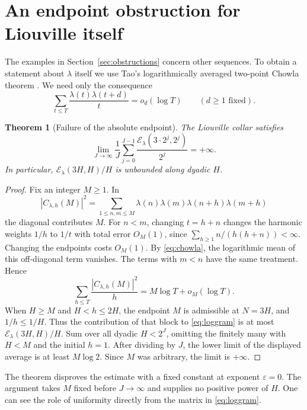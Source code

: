 \documentclass[11pt]{amsart}
\newtheorem{theorem}{Theorem}[section]
\theoremstyle{definition}
\theoremstyle{remark}
\newcommand{\E}{\mathcal E}
\numberwithin{equation}{section}
\begin{document}
\section{An endpoint obstruction for Liouville itself}\label{sec:tao}

The examples in Section~\ref{sec:obstructions} concern other sequences. To obtain a statement about \(\lambda\) itself we use Tao's logarithmically averaged two-point Chowla theorem \cite{tao}. We need only the consequence
\begin{equation}\label{eq:chowla}
 \sum_{t\le T}\frac{\lambda(t)\lambda(t+d)}{t}=o_d(\log T)
 \qquad(d\ge1\text{ fixed}).
\end{equation}

\begin{theorem}[Failure of the absolute endpoint]\label{thm:endpoint}
The Liouville collar satisfies
\[
 \lim_{J\to\infty}\frac1J
 \sum_{j=0}^{J-1}\frac{\E_\lambda(3\cdot 2^j,2^j)}{2^j}=+\infty.
\]
In particular, \(\E_\lambda(3H,H)/H\) is unbounded along dyadic \(H\).
\end{theorem}
\begin{proof}
Fix an integer \(M\ge1\). In
\[
 |C_{\lambda,h}(M)|^2=
 \sum_{1\le n,m\le M}\lambda(n)\lambda(m)\lambda(n+h)\lambda(m+h)
\]
the diagonal contributes \(M\). For \(n<m\), changing \(t=h+n\) changes the harmonic weights \(1/h\) to \(1/t\) with total error \(O_M(1)\), since \(\sum_{h\ge1}n/(h(h+n))<\infty\). Changing the endpoints costs \(O_M(1)\). By \eqref{eq:chowla}, the logarithmic mean of this off-diagonal term vanishes. The terms with \(m<n\) have the same treatment. Hence
\begin{equation}\label{eq:loggram}
 \sum_{h\le T}\frac{|C_{\lambda,h}(M)|^2}{h}
 =M\log T+o_M(\log T).
\end{equation}
When \(H\ge M\) and \(H<h\le2H\), the endpoint \(M\) is admissible at \(N=3H\), and \(1/h\le1/H\). Thus the contribution of that block to \eqref{eq:loggram} is at most \(\E_\lambda(3H,H)/H\). Sum over all dyadic \(H<2^J\), omitting the finitely many with \(H<M\) and the initial \(h=1\). After dividing by \(J\), the lower limit of the displayed average is at least \(M\log 2\). Since \(M\) was arbitrary, the limit is \(+\infty\).
\end{proof}

The theorem disproves the estimate with a fixed constant at exponent \(\varepsilon=0\). The argument takes \(M\) fixed before \(J\to\infty\) and supplies no positive power of \(H\). One can see the role of uniformity directly from the matrix in \eqref{eq:loggram}.
\end{document}
